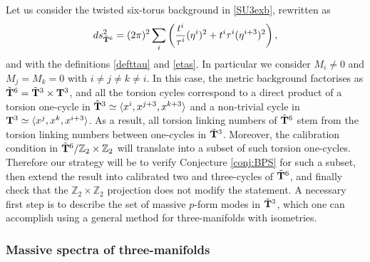 \documentclass[11pt]{article}
\def\be{\begin{equation}}
\def\ee{\end{equation}}
\newcommand{\IZ}{\mathbb{Z}}
\begin{document}
Let us consider the twisted six-torus background in \eqref{SU3exb}, rewritten as
\be
ds^2_{\tilde{\bf T}^6} = (2\pi)^2 \sum_i \left(\frac{t^i}{\tau^i}(\eta^i)^2+t^i\tau^i(\eta^{i+3})^2 \right) ,
\label{SU3exc}
\ee
and with the definitions \eqref{defttau} and \eqref{etas}. In particular we consider $M_i \neq 0$ and $M_j = M_k =0$ with $i \neq j\neq k \neq i$. In this case, the metric background factorises as $\tilde{\bf T}^6 = \tilde{\bf T}^3 \times {\bf T}^3$, and all the torsion cycles correspond to a direct product of a torsion one-cycle in $\tilde{\bf T}^3 \simeq \langle x^i, x^{j+3}, x^{k+3} \rangle$ and a non-trivial cycle in ${\bf T}^3 \simeq \langle x^j, x^k, x^{i+3}\rangle$. As a result, all torsion linking numbers of $\tilde{\bf T}^6$ stem from the torsion linking numbers between one-cycles in $\tilde{\bf T}^3$. Moreover, the calibration condition in $\tilde{\bf T}^6/\IZ_2 \times \IZ_2$ will translate into a subset of such torsion one-cycles. Therefore our strategy will be to verify Conjecture \ref{conj:BPS} for such a subset, then extend the result into calibrated two and three-cycles of $\tilde{\bf T}^6$, and finally check that the $\IZ_2 \times \IZ_2$ projection does not modify the statement. A necessary first step is to describe the set of massive $p$-form modes in $\tilde{\bf T}^3$, which one can accomplish using a general method for three-manifolds with isometries. 

\subsubsection*{Massive spectra of three-manifolds}
\end{document}
